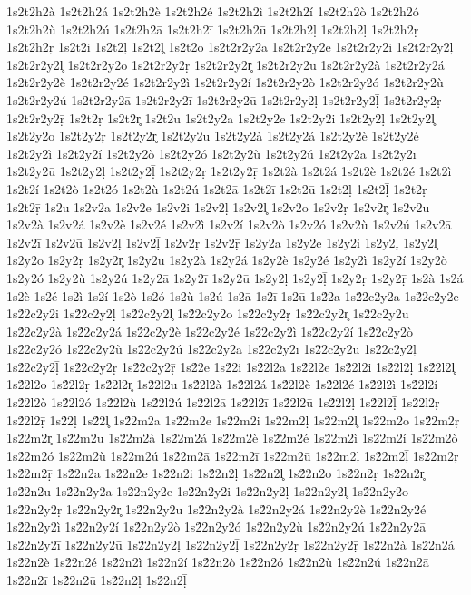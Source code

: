{1s2t2h2à
1s2t2h2á
1s2t2h2è
1s2t2h2é
1s2t2h2ì
1s2t2h2í
1s2t2h2ò
1s2t2h2ó
1s2t2h2ù
1s2t2h2ú
1s2t2h2ā
1s2t2h2ī
1s2t2h2ū
1s2t2h2ḷ
1s2t2h2ḹ
1s2t2h2ṛ
1s2t2h2ṝ
1s2t2i
1s2t2ḷ
1s2t2l̥
1s2t2o
1s2t2r2y2a
1s2t2r2y2e
1s2t2r2y2i
1s2t2r2y2ḷ
1s2t2r2y2l̥
1s2t2r2y2o
1s2t2r2y2ṛ
1s2t2r2y2r̥
1s2t2r2y2u
1s2t2r2y2à
1s2t2r2y2á
1s2t2r2y2è
1s2t2r2y2é
1s2t2r2y2ì
1s2t2r2y2í
1s2t2r2y2ò
1s2t2r2y2ó
1s2t2r2y2ù
1s2t2r2y2ú
1s2t2r2y2ā
1s2t2r2y2ī
1s2t2r2y2ū
1s2t2r2y2ḷ
1s2t2r2y2ḹ
1s2t2r2y2ṛ
1s2t2r2y2ṝ
1s2t2ṛ
1s2t2r̥
1s2t2u
1s2t2y2a
1s2t2y2e
1s2t2y2i
1s2t2y2ḷ
1s2t2y2l̥
1s2t2y2o
1s2t2y2ṛ
1s2t2y2r̥
1s2t2y2u
1s2t2y2à
1s2t2y2á
1s2t2y2è
1s2t2y2é
1s2t2y2ì
1s2t2y2í
1s2t2y2ò
1s2t2y2ó
1s2t2y2ù
1s2t2y2ú
1s2t2y2ā
1s2t2y2ī
1s2t2y2ū
1s2t2y2ḷ
1s2t2y2ḹ
1s2t2y2ṛ
1s2t2y2ṝ
1s2t2à
1s2t2á
1s2t2è
1s2t2é
1s2t2ì
1s2t2í
1s2t2ò
1s2t2ó
1s2t2ù
1s2t2ú
1s2t2ā
1s2t2ī
1s2t2ū
1s2t2ḷ
1s2t2ḹ
1s2t2ṛ
1s2t2ṝ
1s2u
1s2v2a
1s2v2e
1s2v2i
1s2v2ḷ
1s2v2l̥
1s2v2o
1s2v2ṛ
1s2v2r̥
1s2v2u
1s2v2à
1s2v2á
1s2v2è
1s2v2é
1s2v2ì
1s2v2í
1s2v2ò
1s2v2ó
1s2v2ù
1s2v2ú
1s2v2ā
1s2v2ī
1s2v2ū
1s2v2ḷ
1s2v2ḹ
1s2v2ṛ
1s2v2ṝ
1s2y2a
1s2y2e
1s2y2i
1s2y2ḷ
1s2y2l̥
1s2y2o
1s2y2ṛ
1s2y2r̥
1s2y2u
1s2y2à
1s2y2á
1s2y2è
1s2y2é
1s2y2ì
1s2y2í
1s2y2ò
1s2y2ó
1s2y2ù
1s2y2ú
1s2y2ā
1s2y2ī
1s2y2ū
1s2y2ḷ
1s2y2ḹ
1s2y2ṛ
1s2y2ṝ
1s2à
1s2á
1s2è
1s2é
1s2ì
1s2í
1s2ò
1s2ó
1s2ù
1s2ú
1s2ā
1s2ī
1s2ū
1s2́2a
1s2́2c2y2a
1s2́2c2y2e
1s2́2c2y2i
1s2́2c2y2ḷ
1s2́2c2y2l̥
1s2́2c2y2o
1s2́2c2y2ṛ
1s2́2c2y2r̥
1s2́2c2y2u
1s2́2c2y2à
1s2́2c2y2á
1s2́2c2y2è
1s2́2c2y2é
1s2́2c2y2ì
1s2́2c2y2í
1s2́2c2y2ò
1s2́2c2y2ó
1s2́2c2y2ù
1s2́2c2y2ú
1s2́2c2y2ā
1s2́2c2y2ī
1s2́2c2y2ū
1s2́2c2y2ḷ
1s2́2c2y2ḹ
1s2́2c2y2ṛ
1s2́2c2y2ṝ
1s2́2e
1s2́2i
1s2́2l2a
1s2́2l2e
1s2́2l2i
1s2́2l2ḷ
1s2́2l2l̥
1s2́2l2o
1s2́2l2ṛ
1s2́2l2r̥
1s2́2l2u
1s2́2l2à
1s2́2l2á
1s2́2l2è
1s2́2l2é
1s2́2l2ì
1s2́2l2í
1s2́2l2ò
1s2́2l2ó
1s2́2l2ù
1s2́2l2ú
1s2́2l2ā
1s2́2l2ī
1s2́2l2ū
1s2́2l2ḷ
1s2́2l2ḹ
1s2́2l2ṛ
1s2́2l2ṝ
1s2́2ḷ
1s2́2l̥
1s2́2m2a
1s2́2m2e
1s2́2m2i
1s2́2m2ḷ
1s2́2m2l̥
1s2́2m2o
1s2́2m2ṛ
1s2́2m2r̥
1s2́2m2u
1s2́2m2à
1s2́2m2á
1s2́2m2è
1s2́2m2é
1s2́2m2ì
1s2́2m2í
1s2́2m2ò
1s2́2m2ó
1s2́2m2ù
1s2́2m2ú
1s2́2m2ā
1s2́2m2ī
1s2́2m2ū
1s2́2m2ḷ
1s2́2m2ḹ
1s2́2m2ṛ
1s2́2m2ṝ
1s2́2n2a
1s2́2n2e
1s2́2n2i
1s2́2n2ḷ
1s2́2n2l̥
1s2́2n2o
1s2́2n2ṛ
1s2́2n2r̥
1s2́2n2u
1s2́2n2y2a
1s2́2n2y2e
1s2́2n2y2i
1s2́2n2y2ḷ
1s2́2n2y2l̥
1s2́2n2y2o
1s2́2n2y2ṛ
1s2́2n2y2r̥
1s2́2n2y2u
1s2́2n2y2à
1s2́2n2y2á
1s2́2n2y2è
1s2́2n2y2é
1s2́2n2y2ì
1s2́2n2y2í
1s2́2n2y2ò
1s2́2n2y2ó
1s2́2n2y2ù
1s2́2n2y2ú
1s2́2n2y2ā
1s2́2n2y2ī
1s2́2n2y2ū
1s2́2n2y2ḷ
1s2́2n2y2ḹ
1s2́2n2y2ṛ
1s2́2n2y2ṝ
1s2́2n2à
1s2́2n2á
1s2́2n2è
1s2́2n2é
1s2́2n2ì
1s2́2n2í
1s2́2n2ò
1s2́2n2ó
1s2́2n2ù
1s2́2n2ú
1s2́2n2ā
1s2́2n2ī
1s2́2n2ū
1s2́2n2ḷ
1s2́2n2ḹ
}
